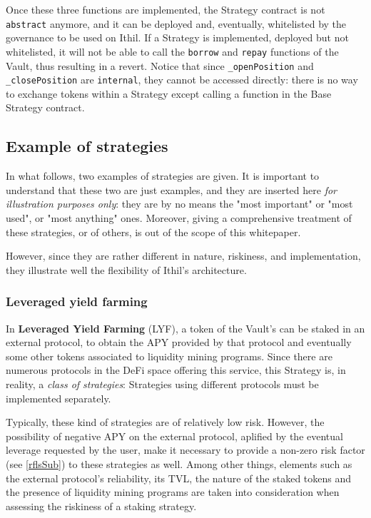\documentclass[a4paper,10 pt]{article}
\theoremstyle{definition}
\begin{document}
Once these three functions are implemented, the Strategy contract is not \verb|abstract| anymore, and it can be deployed and, eventually, whitelisted by the governance to be used on Ithil. If a Strategy is implemented, deployed but not whitelisted, it will not be able to call the \verb|borrow| and \verb|repay| functions of the Vault, thus resulting in a revert. Notice that since \verb|_openPosition| and \verb|_closePosition| are \verb|internal|, they cannot be accessed directly: there is no way to exchange tokens within a Strategy except calling a function in the Base Strategy contract.

\subsection{Example of strategies}\label{exstrSub}

In what follows, two examples of strategies are given. It is important to understand that these two are just examples, and they are inserted here {\it for illustration purposes only}: they are by no means the "most important" or "most used", or "most anything" ones. Moreover, giving a comprehensive treatment of these strategies, or of others, is out of the scope of this whitepaper. 

However, since they are rather different in nature, riskiness, and implementation, they illustrate well the flexibility of Ithil's architecture.
 
\subsubsection{Leveraged yield farming}\label{lyfSubSub}

In {\bf Leveraged Yield Farming} (LYF), a token of the Vault's can be staked in an external protocol, to obtain the APY provided by that protocol and eventually some other tokens associated to liquidity mining programs. Since there are numerous protocols in the DeFi space offering this service, this Strategy is, in reality, a {\it class of strategies}: Strategies using different protocols must be implemented separately.

Typically, these kind of strategies are of relatively low risk. However, the possibility of negative APY on the external protocol, aplified by the eventual leverage requested by the user, make it necessary to provide a non-zero risk factor (see \ref{rflsSub}) to these strategies as well. Among other things, elements such as the external protocol's reliability, its TVL, the nature of the staked tokens and the presence of liquidity mining programs are taken into consideration when assessing the riskiness of a staking strategy.
\end{document}
